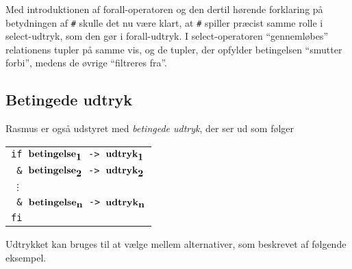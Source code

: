 
Med introduktionen af forall-operatoren og den dertil h\o{}rende
forklaring p\aa{} betydningen af \verb"#" skulle det nu v\ae{}re
klart, at \verb"#" spiller pr\ae{}cist samme rolle i select-udtryk,
som den g\o{}r i forall-udtryk. I select-operatoren ``genneml\o{}bes''
relationens tupler p\aa{} samme vis, og de tupler, der opfylder
betingelsen ``smutter forbi'', medens de \o{}vrige ``filtreres fra''.

\subsection{Betingede udtryk}
{\sc Rasmus} er ogs\aa{} udstyret med {\em betingede udtryk}, der ser
ud som f\o{}lger
\begin{center}
\begin{tabular}{l}
\verb"if "$\mbox{\bf betingelse}_{\mbox{\bf 1}}$\verb" -> "$\mbox{\bf udtryk}_{\mbox{\bf 1}}$\\
\verb" & "$\mbox{\bf betingelse}_{\mbox{\bf 2}}$\verb" -> "$\mbox{\bf udtryk}_{\mbox{\bf 2}}$\\
\verb" "$\vdots$\\
\verb" & "$\mbox{\bf betingelse}_{\mbox{\bf n}}$\verb" -> "$\mbox{\bf udtryk}_{\mbox{\bf n}}$\\
\verb"fi"
\end{tabular}
\end{center}
Udtrykket kan bruges til at v\ae{}lge mellem alternativer, som
beskrevet af f\o{}lgende eksempel.


